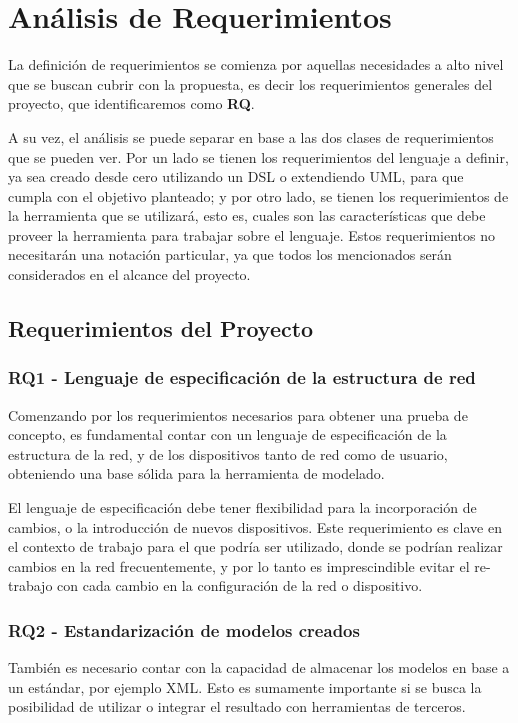 \chapter{Análisis de Requerimientos} \label{Analisis de Requerimientos}

La definición de requerimientos se comienza por aquellas necesidades a alto nivel que se buscan cubrir con la propuesta, es decir los requerimientos generales del proyecto, que identificaremos como \textbf{RQ}.

A su vez, el análisis se puede separar en base a las dos clases de requerimientos que se pueden ver. Por un lado se tienen los requerimientos del lenguaje a definir, ya sea creado desde cero utilizando un DSL o extendiendo UML, para que cumpla con el objetivo planteado; y por otro lado, se tienen los requerimientos de la herramienta que se utilizará, esto es, cuales son las características que debe proveer la herramienta para trabajar sobre el lenguaje.
Estos requerimientos no necesitarán una notación particular, ya que todos los mencionados serán considerados en el alcance del proyecto.

\section{Requerimientos del Proyecto}
\subsection{RQ1 - Lenguaje de especificación de la estructura de red} \label{RQ1}
Comenzando por los requerimientos necesarios para obtener una prueba de concepto, es fundamental contar con un lenguaje de especificación de la estructura de la red, y de los dispositivos tanto de red como de usuario, obteniendo una base sólida para la herramienta de modelado.

El lenguaje de especificación debe tener flexibilidad para la incorporación de cambios, o la introducción de nuevos dispositivos. Este requerimiento es clave en el contexto de trabajo para el que podría ser utilizado, donde se podrían realizar cambios en la red frecuentemente, y por lo tanto es imprescindible evitar el re-trabajo con cada cambio en la configuración de la red o dispositivo.

\subsection{RQ2 - Estandarización de modelos creados} \label{RQ2}
También es necesario contar con la capacidad de almacenar los modelos en base a un estándar, por ejemplo XML. Esto es sumamente importante si se busca la posibilidad de utilizar o integrar el resultado con herramientas de terceros.

